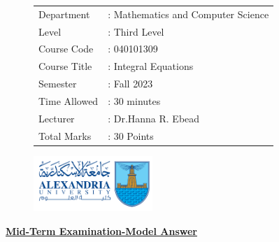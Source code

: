 \documentclass[]{article}
\begin{document}
\begin{figure}
    \begin{minipage}{0.7\textwidth}
        \begin{tabular}{l l}
            Department   & : Mathematics and Computer Science \\
            Level        & : Third Level                      \\
            Course Code  & : 040101309                        \\
            Course Title & :  Integral Equations              \\
            Semester     & : Fall 2023                        \\
            Time Allowed & : 30 minutes                       \\
            Lecturer     & : Dr.Hanna R. Ebead                \\
            Total Marks  & : 30 Points                        \\
        \end{tabular}
    \end{minipage}%
    \begin{minipage}{0.3\textwidth}
        \includegraphics[width=4.5cm]{collagelogo.png}
    \end{minipage}
\end{figure}
\vspace*{-1cm}
\begin{center}
    \textbf{\underline{\LARGE Mid-Term Examination-Model Answer}}
\end{center}
\vspace*{.2cm}
\end{document}
